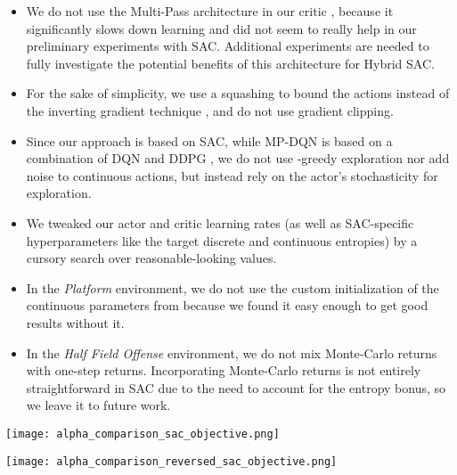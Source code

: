 \documentclass[letterpaper]{article} \usepackage{aaai20}  \usepackage{times}  \usepackage{helvet} \usepackage{courier}  \usepackage[hyphens]{url}  \usepackage{graphicx} \urlstyle{rm} \def\UrlFont{\rm}  \usepackage{graphicx}  \usepackage[section]{placeins}
\newcommand{\citet}{\cite}  \newcommand{\citep}{\cite} \DeclareMathOperator*{\softmax}{softmax}
\begin{document}
\begin{itemize}
    \item We do not use the Multi-Pass architecture in our critic , because it significantly slows down learning and did not seem to really help in our preliminary experiments with SAC.
    Additional experiments are needed to fully investigate the potential benefits of this architecture for Hybrid SAC.
    \item For the sake of simplicity, we use a squashing  to bound the actions instead of the inverting gradient technique \citep{hausknecht2016}, and do not use gradient clipping.
    \item Since our approach is based on SAC, while MP-DQN is based on a combination of DQN \citep{mnih2015human} and DDPG \citep{lillicrap2016}, we do not use -greedy exploration nor add noise to continuous actions, but instead rely on the actor's stochasticity for exploration.
    \item We tweaked our actor and critic learning rates (as well as SAC-specific hyperparameters like the target discrete and continuous entropies) by a cursory search over reasonable-looking values.
    \item In the {\em Platform} environment, we do not use the custom initialization of the continuous parameters from \citet{bester2019} because we found it easy enough to get good results without it.
    \item In the {\em Half Field Offense} environment, we do not mix Monte-Carlo returns with one-step returns. Incorporating Monte-Carlo returns is not entirely straightforward in SAC due to the need to account for the entropy bonus, so we leave it to future work.
\end{itemize}

\begin{figure*}[!htbp]
\centering
\texttt{[image: alpha\_comparison\_sac\_objective.png]} \caption{Comparison between the final shapes of the policy distribution  (in orange) trained with the same objective as SAC after trying to match a Gaussian mixture  (in blue) with different temperatures  for 10,000 steps. Note the collapse of the policies on one mode of  unless  gets very high, for both normalizing flows (top row) and Gaussian policy (bottom row).
}
\label{fig_alpha_comparison_sac_objective}
\end{figure*}

\begin{figure*}[!htbp]
\centering
\texttt{[image: alpha\_comparison\_reversed\_sac\_objective.png]} \caption{Same as Fig.~\ref{fig_alpha_comparison_sac_objective} but swapping the arguments of the KL divergence objective. Note that the policies no longer collapse onto a single mode of the target , and the normalizing flow policy is better able to approximate the shape of .}
\label{fig_alpha_comparison_reversed_sac_objective}
\end{figure*}
\end{document}
